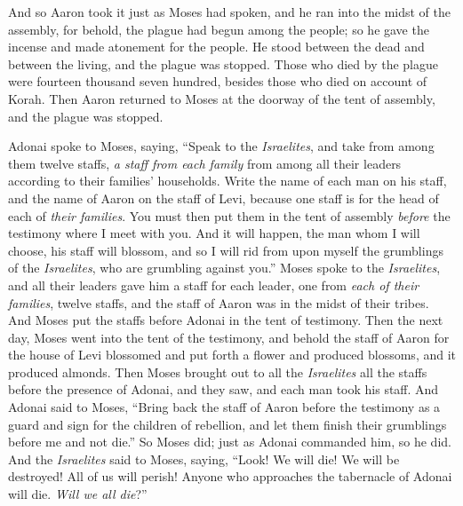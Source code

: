 \begin{biblechapter}
\verse And so Aaron took it just as Moses had spoken, and he ran into the midst of the assembly, for behold, the plague had begun among the people; so he gave the incense and made atonement for the people.
\verse He stood between the dead and between the living, and the plague was stopped.
\verse Those who died by the plague were fourteen thousand seven hundred, besides those who died on account of Korah.
\verse Then Aaron returned to Moses at the doorway of the tent of assembly, and the plague was stopped.
\end{biblechapter}

\begin{biblechapter} %
 Adonai spoke to Moses, saying,
\verse “Speak to the \textit{Israelites}, and take from among them twelve staffs, \textit{a staff from each family} from among all their leaders according to their families’ households. Write the name of each man on his staff,
\verse and the name of Aaron on the staff of Levi, because one staff is for the head of each of \textit{their families}.
\verse You must then put them in the tent of assembly \textit{before} the testimony where I meet with you.
\verse And it will happen, the man whom I will choose, his staff will blossom, and so I will rid from upon myself the grumblings of the \textit{Israelites}, who are grumbling against you.”
\verse Moses spoke to the \textit{Israelites}, and all their leaders gave him a staff for each leader, one from \textit{each of their families}, twelve staffs, and the staff of Aaron was in the midst of their tribes.
\verse And Moses put the staffs before Adonai in the tent of testimony.
\verse Then the next day, Moses went into the tent of the testimony, and behold the staff of Aaron for the house of Levi blossomed and put forth a flower and produced blossoms, and it produced almonds.
\verse Then Moses brought out to all the \textit{Israelites} all the staffs before the presence of Adonai, and they saw, and each man took his staff.
\verse And Adonai said to Moses, “Bring back the staff of Aaron before the testimony as a guard and sign for the children of rebellion, and let them finish their grumblings before me and not die.”
\verse So Moses did; just as Adonai commanded him, so he did.
\verse And the \textit{Israelites} said to Moses, saying, “Look! We will die! We will be destroyed! All of us will perish!
\verse Anyone who approaches the tabernacle of Adonai will die. \textit{Will we all die}?”
\end{biblechapter}

